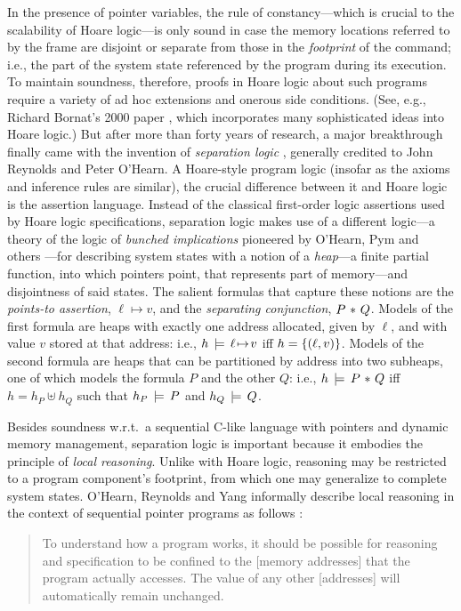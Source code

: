 \documentclass[11pt]{report}
\begin{document}
In the presence of pointer variables, the rule of constancy---which is crucial to the scalability of Hoare logic---is only sound in case the memory locations referred to by the frame are disjoint or separate from those in the \emph{footprint} of the command; i.e., the part of the system state referenced by the program during its execution. To maintain soundness, therefore, proofs in Hoare logic about such programs require a variety of ad hoc extensions and onerous side conditions. (See, e.g., Richard Bornat's 2000 paper \cite{DBLP:conf/mpc/Bornat00}, which incorporates many sophisticated ideas into Hoare logic.) But after more than forty years of research, a major breakthrough finally came with the invention of \emph{separation logic} \cite{DBLP:conf/lics/Reynolds02}, generally credited to John Reynolds and Peter O'Hearn. A Hoare-style program logic (insofar as the axioms and inference rules are similar), the crucial difference between it and Hoare logic is the assertion language. Instead of the classical first-order logic assertions used by Hoare logic specifications, separation logic makes use of a different logic---a theory of the logic of \emph{bunched implications} pioneered by O'Hearn, Pym and others \cite{DBLP:journals/bsl/OHearnP99,DBLP:journals/tcs/PymOY04}---for describing system states with a notion of a \emph{heap}---a finite partial function, into which pointers point, that represents part of memory---and disjointness of said states. The salient formulas that capture these notions are the \emph{points-to assertion}, $\ell \mapsto v$, and the \emph{separating conjunction}, $P \operatorname{\,\ast\,} Q$. Models of the first formula are heaps with exactly one address allocated, given by $\ell$, and with value $v$ stored at that address: i.e., $h \,\models\, \ell \!\mapsto\! v$ iff $h = \left\lbrace (\ell,v) \right\rbrace$. Models of the second formula are heaps that can be partitioned by address into two subheaps, one of which models the formula $P$ and the other $Q$: i.e., $h \,\models\, P \operatorname{\,\ast\,} Q$ iff $h = h_P \uplus h_Q$ such that $h_P \,\models\, P$ and $h_Q \,\models\, Q$. 

Besides soundness w.r.t.~a sequential C-like language with pointers and dynamic memory management, separation logic is important because it embodies the principle of \emph{local reasoning}. Unlike with Hoare logic, reasoning may be restricted to a program component's footprint, from which one may generalize to complete system states. O'Hearn, Reynolds and Yang informally describe local reasoning in the context of sequential pointer programs as follows \cite{DBLP:conf/csl/OHearnRY01}: \begin{quotation}\noindent To understand how a program works, it should be possible for reasoning and specification to be confined to the [memory addresses] that the program actually accesses. The value of any other [addresses] will automatically remain unchanged.\end{quotation}
\end{document}
